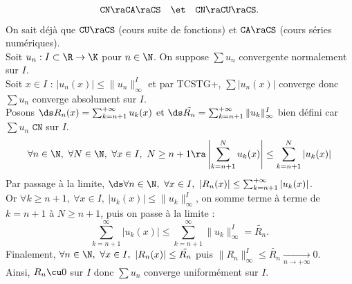 \documentclass[11pt]{article}
\begin{document}
\begin{prop}{}{}
    \begin{equation*}
        \texttt{CN} \ra \texttt{CA} \ra \texttt{CS} \quad \et \quad \texttt{CN} \ra \texttt{CU} \ra \texttt{CS}.
    \end{equation*}
    \tcblower
    On sait déjà que $\texttt{CU} \ra \texttt{CS}$ (cours suite de fonctions) et $\texttt{CA} \ra \texttt{CS}$ (cours séries numériques).\\
     Soit $u_n:I\subset\R\to\K$ pour $n\in\N$. On suppose $\sum u_n$ convergente normalement sur $I$.\\
    Soit $x\in I$ : $|u_n(x)|\leq\|u_n\|_\infty^I$ et par TCSTG+, $\sum|u_n(x)|$ converge donc $\sum u_n$ converge absolument sur $I$.\\
     Posons $\ds R_n(x)=\sum_{k=n+1}^{+\infty}u_k(x)$ et $\ds \tilde{R_n}=\sum_{k=n+1}^{+\infty}\|u_k\|_\infty^I$ bien défini car $\sum u_n$ $\texttt{CN}$ sur $I$.
    \begin{equation*}\forall n \in \N, ~ \forall N\in\N, ~ \forall x \in I, ~ N\geq n+1 \ra \left|\sum_{k=n+1}^Nu_k(x)\right|\leq\sum_{k=n+1}^N\left|u_k(x)\right|\end{equation*}
    Par passage à la limite, $\ds \forall n \in \N, ~ \forall x \in I, ~ |R_n(x)|\leq\sum_{k=n+1}^{+\infty}|u_k(x)|$.\\
    Or $\forall k \geq n+1, ~ \forall x \in I, ~ |u_k(x)|\leq\|u_k\|_\infty^I$, on somme terme à terme de $k=n+1$ à $N\geq n+1$, puis on passe à la limite :
    \begin{equation*}
        \sum_{k=n+1}^{\infty}|u_k(x)| \leq \sum_{k=n+1}^{\infty}\|u_k\|_{\infty}^I = \tilde{R_n}.
    \end{equation*}
    Finalement, $\forall n \in \N, ~ \forall x \in I, ~ |R_n(x)|\leq\tilde{R_n}$ puis $\|R_n\|_\infty^I\leq\tilde{R_n}\xrightarrow[n\to+\infty]{}0$.\\
    Ainsi, $R_n\cu0$ sur $I$ donc $\sum u_n$ converge uniformément sur $I$.
\end{prop}

\vspace*{-0.8cm}
\end{document}
